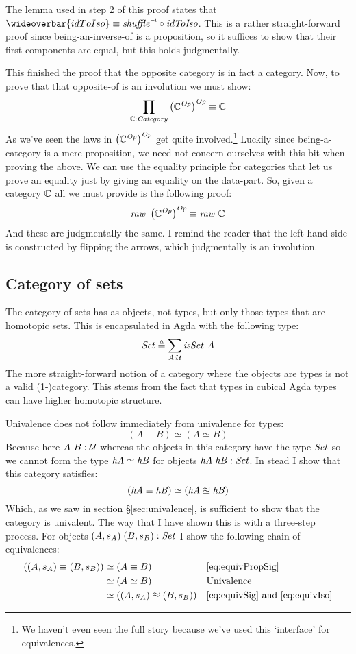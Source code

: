 The lemma used in step 2 of this proof states that $\wideoverbar{idToIso} \equiv
\inv{\shuffle} \comp \idToIso$. This is a rather straight-forward proof
since being-an-inverse-of is a proposition, so it suffices to show that their
first components are equal, but this holds judgmentally.

This finished the proof that the opposite category is in fact a category. Now,
to prove that that opposite-of is an involution we must show:
%
$$
\prod_{\bC \tp \Category} \left(\bC^{\var{Op}}\right)^{\var{Op}} \equiv \bC
$$
%
As we've seen the laws in $\left(\mathbb{C}^{\mathit{Op}}\right)^{\mathit{Op}}$ get quite
involved.\footnote{We haven't even seen the full story because we've used this
  `interface' for equivalences.} Luckily since being-a-category is a mere
proposition, we need not concern ourselves with this bit when proving the above.
We can use the equality principle for categories that let us prove an equality
just by giving an equality on the data-part. So, given a category $\mathbb{C}$ all we
must provide is the following proof:
%
$$
\var{raw}\ \left(\bC^{\var{Op}}\right)^{\var{Op}} \equiv \var{raw}\ \bC
$$
%
And these are judgmentally the same. I remind the reader that the left-hand side
is constructed by flipping the arrows, which judgmentally is an involution.

\subsection{Category of sets}
The category of sets has as objects, not types, but only those types that are
homotopic sets. This is encapsulated in Agda with the following type:
%
$$\Set \defeq \sum_{A \tp \MCU} \isSet\ A$$
%
The more straight-forward notion of a category where the objects are types is
not a valid \mbox{(1-)category}. This stems from the fact that types in cubical
Agda types can have higher homotopic structure.

Univalence does not follow immediately from univalence for types:
%
$$(A \equiv B) \simeq (A \simeq B)$$
%
Because here $A\ B \mathrel{:} \mathcal{U}$ whereas the objects in this category have the type
$\Set$ so we cannot form the type $\mathit{hA} \simeq \mathit{hB}$ for objects
$\var{hA}\;\var{hB} \tp \Set$. In stead I show that this category
satisfies:
%
$$
(\mathit{hA} \equiv \mathit{hB}) \simeq (\mathit{hA} \approxeq \mathit{hB})
$$
%
Which, as we saw in section \S\ref{sec:univalence}, is sufficient to show that the
category is univalent. The way that I have shown this is with a three-step
process. For objects $(A, s_A)\; (B, s_B) \tp \Set$ I show the following chain
of equivalences:
%
\begin{align*}
((A, s_A) \equiv (B, s_B))
 & \simeq (A \equiv B) && \ref{eq:equivPropSig} \\
 & \simeq (A \simeq B) && \text{Univalence} \\
 & \simeq ((A, s_A) \approxeq (B, s_B)) && \text{\ref{eq:equivSig} and \ref{eq:equivIso}}
\end{align*}

